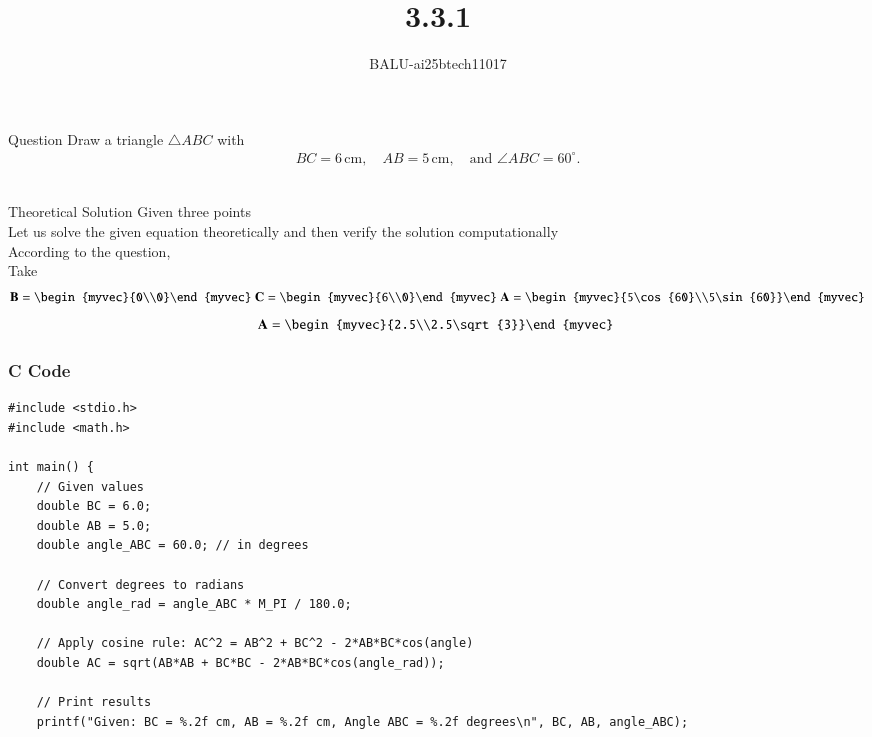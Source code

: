 \documentclass{beamer}
\title %
{3.3.1}
\author %
{BALU-ai25btech11017}
\begin{document}
\frame{\titlepage}
\begin{frame}{Question}
Draw a triangle $\triangle ABC$ with 
\begin{align}
BC = 6 \,\text{cm}, \quad AB = 5 \,\text{cm}, \quad \text{and } \angle ABC = 60^\circ.
\end{align}\\ 
\end{frame}
\begin{frame}{Theoretical Solution}
Given three points\\
Let us solve the given equation theoretically and then verify the solution computationally \\
According to the question, \\
Take\\
\begin{align}
\vec{B}=\begin{myvec}{0\\0}\end{myvec}\
\vec{C}=\begin{myvec}{6\\0}\end{myvec}\
\vec{A}=\begin{myvec}{5\cos{60}\\5\sin{60}}\end{myvec}
\end{align}
   \begin{align}
 \vec{A}=\begin{myvec}{2.5\\2.5\sqrt{3}}\end{myvec}\
\end{align}
\end{frame}
\begin{frame}[fragile]
    \frametitle{C Code}

    \begin{lstlisting}
#include <stdio.h>
#include <math.h>

int main() {
    // Given values
    double BC = 6.0;
    double AB = 5.0;
    double angle_ABC = 60.0; // in degrees

    // Convert degrees to radians
    double angle_rad = angle_ABC * M_PI / 180.0;

    // Apply cosine rule: AC^2 = AB^2 + BC^2 - 2*AB*BC*cos(angle)
    double AC = sqrt(AB*AB + BC*BC - 2*AB*BC*cos(angle_rad));

    // Print results
    printf("Given: BC = %.2f cm, AB = %.2f cm, Angle ABC = %.2f degrees\n", BC, AB, angle_ABC);
   
     \end{lstlisting}
\end{frame}
\end{document}
